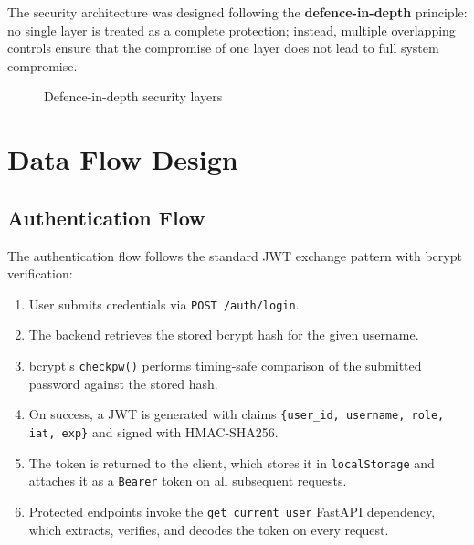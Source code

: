 \documentclass[12pt,a4paper]{report}
\begin{document}
The security architecture was designed following the \textbf{defence-in-depth} principle: no single layer is treated as a complete protection; instead, multiple overlapping controls ensure that the compromise of one layer does not lead to full system compromise.

\begin{figure}[H]
\centering
{}
\caption{Defence-in-depth security layers}
\label{fig:security_layers}
\end{figure}

\section{Data Flow Design}

\subsection{Authentication Flow}

The authentication flow follows the standard JWT exchange pattern with bcrypt verification:

\begin{enumerate}[leftmargin=2em]
    \item User submits credentials via \texttt{POST /auth/login}.
    \item The backend retrieves the stored bcrypt hash for the given username.
    \item bcrypt's \texttt{checkpw()} performs timing-safe comparison of the submitted password against the stored hash.
    \item On success, a JWT is generated with claims \texttt{\{user\_id, username, role, iat, exp\}} and signed with HMAC-SHA256.
    \item The token is returned to the client, which stores it in \texttt{localStorage} and attaches it as a \texttt{Bearer} token on all subsequent requests.
    \item Protected endpoints invoke the \texttt{get\_current\_user} FastAPI dependency, which extracts, verifies, and decodes the token on every request.
\end{enumerate}
\end{document}
